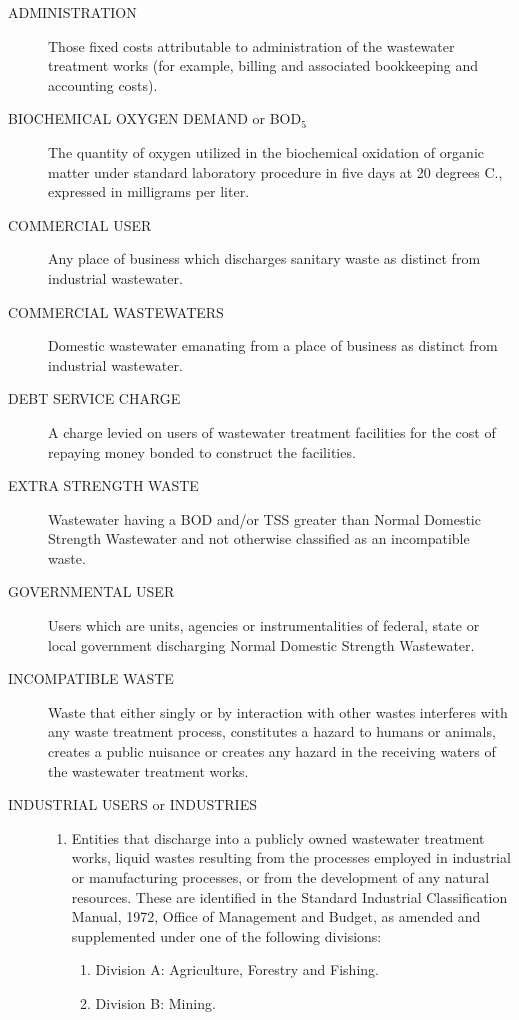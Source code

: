 \begin{description}
\item[ADMINISTRATION] Those fixed costs attributable to administration of the wastewater treatment works (for example, billing and associated bookkeeping and accounting costs).
\item[BIOCHEMICAL OXYGEN DEMAND or BOD$_{5}$] The quantity of oxygen utilized in the biochemical oxidation of organic matter under standard laboratory procedure in five days at 20 degrees C., expressed in milligrams per liter.
\item[COMMERCIAL USER] Any place of business which discharges sanitary waste as distinct from industrial wastewater.
\item[COMMERCIAL WASTEWATERS] Domestic wastewater emanating from a place of business as distinct from industrial wastewater.
\item[DEBT SERVICE CHARGE] A charge levied on users of wastewater treatment facilities for the cost of repaying money bonded to construct the facilities.
\item[EXTRA STRENGTH WASTE] Wastewater having a BOD and/or TSS greater than Normal Domestic Strength Wastewater and not otherwise classified as an incompatible waste.
\item[GOVERNMENTAL USER] Users which are units, agencies or instrumentalities of federal, state or local government discharging Normal Domestic Strength Wastewater.
\item[INCOMPATIBLE WASTE] Waste that either singly or by interaction with other wastes interferes with any waste treatment process, constitutes a hazard to humans or animals, creates a public nuisance or creates any hazard in the receiving waters of the wastewater treatment works.
\item[INDUSTRIAL USERS or INDUSTRIES]
\begin{enumerate}
\item Entities that discharge into a publicly owned wastewater treatment works, liquid wastes resulting from the processes employed in industrial or manufacturing processes, or from the development of any natural resources.  These are identified in the Standard Industrial Classification Manual, 1972, Office of Management and Budget, as amended and supplemented under one of the following divisions:
    \begin{enumerate}[{\indent}a)]
        \item Division A:  Agriculture, Forestry and Fishing.
        \item Division B:  Mining.

\end{enumerate}
\end{enumerate}
\end{description}
